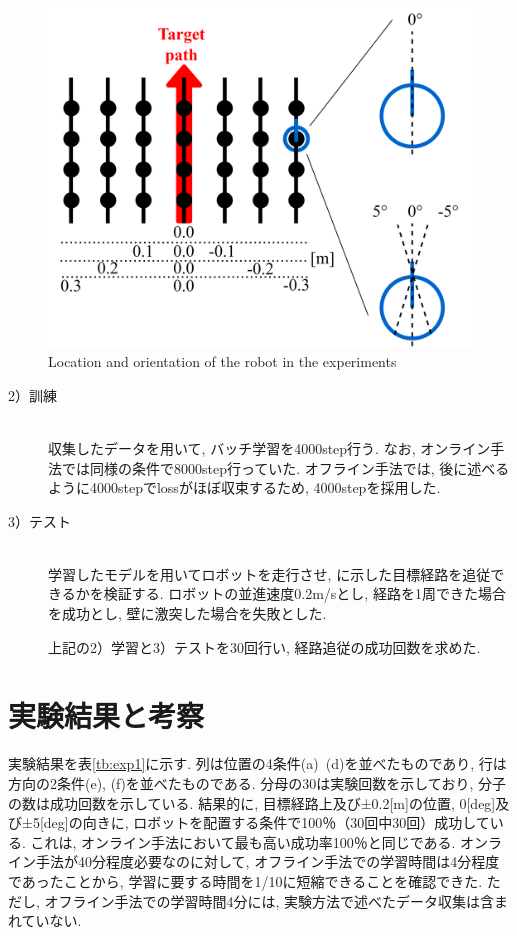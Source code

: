 \begin{figure}[h]
  \centering
  \includegraphics[keepaspectratio, scale=0.6]{images/collect2.png}
  \caption{Location and orientation of the robot in the experiments}
  \label{Fig:old-method}
  \end{figure}

\begin{description}
  \item[2）訓練]\mbox{}\\ \hspace*{3mm}収集したデータを用いて, バッチ学習を4000step行う. なお, オンライン手法では同様の条件で8000step行っていた. オフライン手法では, 後に述べるように4000stepでlossがほぼ収束するため, 4000stepを採用した.
\end{description}

\begin{description}
  \item[3）テスト]\mbox{}\\ \hspace*{3mm}学習したモデルを用いてロボットを走行させ, に示した目標経路を追従できるかを検証する. ロボットの並進速度0.2m/sとし, 経路を1周できた場合を成功とし, 壁に激突した場合を失敗とした.
  \par \hspace*{3mm}上記の2）学習と3）テストを30回行い, 経路追従の成功回数を求めた. 
\end{description}

\section{実験結果と考察}
実験結果を表\ref{tb:exp1}に示す. 列は位置の4条件(a)~(d)を並べたものであり, 行は方向の2条件(e), (f)を並べたものである. 分母の30は実験回数を示しており, 分子の数は成功回数を示している. 結果的に, 目標経路上及び±0.2[m]の位置, 0[deg]及び±5[deg]の向きに, ロボットを配置する条件で100％（30回中30回）成功している. これは, オンライン手法において最も高い成功率100％\cite{okada-si2021}と同じである. オンライン手法が40分程度必要なのに対して, オフライン手法での学習時間は4分程度であったことから, 学習に要する時間を1/10に短縮できることを確認できた. ただし, オフライン手法での学習時間4分には, 実験方法で述べたデータ収集は含まれていない. 

